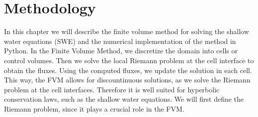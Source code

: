 \chapter{Methodology}
In this chapter we will describe the finite volume method for solving the shallow water equations (SWE) and the numerical implementation of the method in Python.
In the Finite Volume Method, we discretize the domain into cells or control volumes.
Then we solve the local Riemann problem at the cell interface to obtain the fluxes.
Using the computed fluxes, we update the solution in each cell.
This way, the FVM allows for discountinuous solutions, as we solve the Riemann problem at the cell interfaces.
Therefore it is well suited for hyperbolic conservation laws, such as the shallow water equations.
We will first define the Riemann problem, since it plays a crucial role in the FVM.









